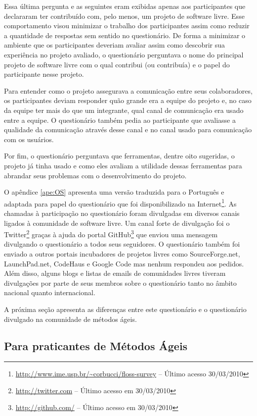 Essa última pergunta e as seguintes eram exibidas apenas aos
participantes que declararam ter contribuído com, pelo menos, um
projeto de software livre. Esse comportamento visou minimizar o
trabalho dos participantes assim como reduzir a quantidade de
respostas sem sentido no questionário. De forma a minimizar o ambiente
que os participantes deveriam avaliar assim como descobrir sua
experiência no projeto avaliado, o questionário perguntava o nome do
principal projeto de software livre com o qual contribui (ou
contribuía) e o papel do participante nesse projeto.

Para entender como o projeto assegurava a comunicação entre seus
colaboradores, os participantes deviam responder quão grande era a
equipe do projeto e, no caso da equipe ter mais do que um integrante,
qual canal de comunicação era usado entre a equipe. O questionário
também pedia ao participante que avaliasse a qualidade da comunicação
através desse canal e no canal usado para comunicação com os usuários.

Por fim, o questionário perguntava que ferramentas, dentre oito
sugeridas, o projeto já tinha usado e como eles avaliam a utilidade
dessas ferramentas para abrandar seus problemas com o desenvolvimento
do projeto.

O apêndice \ref{ape:OS} apresenta uma versão traduzida para o
Português e adaptada para papel do questionário que foi
disponibilizado na
Internet\footnote{\url{http://www.ime.usp.br/~corbucci/floss-survey} --
  Último acesso 30/03/2010}. As chamadas à participação no
questionário foram divulgadas em diversos canais ligados à comunidade
de software livre. Um canal forte de divulgação foi o
Twitter\footnote{\url{http://twitter.com} -- Último acesso em 30/03/2010}
graças à ajuda do portal GitHub\footnote{\url{http://github.com/} -- Último
  acesso em 30/03/2010} que enviou uma mensagem divulgando o
questionário a todos seus seguidores. O questionário também foi
enviado a outros portais incubadores de projetos livres como
SourceForge.net, LaunchPad.net, CodeHaus e Google Code mas nenhum
respondeu aos pedidos. Além disso, alguns blogs e listas de emails de
comunidades livres tiveram divulgações por parte de seus membros sobre
o questionário tanto no âmbito nacional quanto internacional.

A próxima seção apresenta as diferenças entre este questionário e o
questionário divulgado na comunidade de métodos ágeis.

\subsection{Para praticantes de Métodos Ágeis}
\label{subsec:agile}

